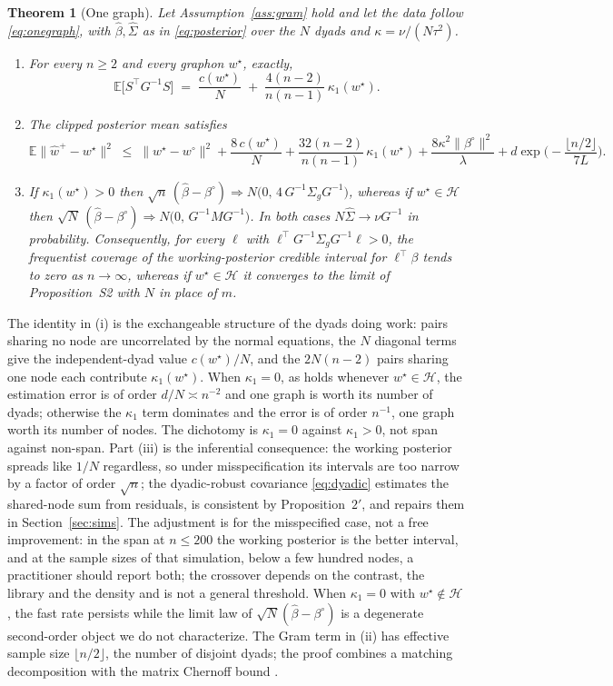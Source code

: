 \documentclass[12pt]{article}
\newtheorem{theorem}{Theorem}
\newcommand{\E}{\mathbb{E}}
\newcommand{\calH}{\mathcal{H}}
\newcommand{\norm}[1]{\|#1\|}
\newcommand{\wstar}{w^{\star}}
\newcommand{\wproj}{w^{\circ}}
\newcommand{\bproj}{\beta^{\circ}}
\newcommand{\whatp}{\hat w^{+}}
\newcommand{\bhat}{\hat\beta}
\newcommand{\Sighat}{\hat\Sigma}
\begin{document}
\begin{theorem}[One graph]
\label{thm:onegraph}
Let Assumption~\ref{ass:gram} hold and let the data follow \eqref{eq:onegraph}, with $\bhat,\Sighat$ as in \eqref{eq:posterior} over the $N$ dyads and $\kappa=\nu/(N\tau^2)$.
\begin{enumerate}
\item[(i)] For every $n\ge2$ and every graphon $\wstar$, exactly,
\[
\E\big[S^{\top}G^{-1}S\big]\;=\;\frac{c(\wstar)}{N}\;+\;\frac{4(n-2)}{n(n-1)}\,\kappa_1(\wstar).
\]
\item[(ii)] The clipped posterior mean satisfies
\[
\E\norm{\whatp-\wstar}^2\;\le\;\norm{\wstar-\wproj}^2+\frac{8\,c(\wstar)}{N}+\frac{32(n-2)}{n(n-1)}\,\kappa_1(\wstar)+\frac{8\kappa^2\norm{\bproj}^2}{\lambda}+d\exp\Big(-\frac{\lfloor n/2\rfloor}{7L}\Big).
\]
\item[(iii)] If $\kappa_1(\wstar)>0$ then $\sqrt n\,(\bhat-\bproj)\Rightarrow N\big(0,\,4\,G^{-1}\Sigma_gG^{-1}\big)$, whereas if $\wstar\in\calH$ then $\sqrt N\,(\bhat-\bproj)\Rightarrow N\big(0,\,G^{-1}MG^{-1}\big)$. In both cases $N\Sighat\to \nu G^{-1}$ in probability. Consequently, for every $\ell$ with $\ell^{\top}G^{-1}\Sigma_gG^{-1}\ell>0$, the frequentist coverage of the working-posterior credible interval for $\ell^{\top}\beta$ tends to zero as $n\to\infty$, whereas if $\wstar\in\calH$ it converges to the limit of Proposition~S2 with $N$ in place of $m$.
\end{enumerate}
\end{theorem}

The identity in (i) is the exchangeable structure of the dyads doing work: pairs sharing no node are uncorrelated by the normal equations, the $N$ diagonal terms give the independent-dyad value $c(\wstar)/N$, and the $2N(n-2)$ pairs sharing one node each contribute $\kappa_1(\wstar)$. When $\kappa_1=0$, as holds whenever $\wstar\in\calH$, the estimation error is of order $d/N\asymp n^{-2}$ and one graph is worth its number of dyads; otherwise the $\kappa_1$ term dominates and the error is of order $n^{-1}$, one graph worth its number of nodes. The dichotomy is $\kappa_1=0$ against $\kappa_1>0$, not span against non-span. Part (iii) is the inferential consequence: the working posterior spreads like $1/N$ regardless, so under misspecification its intervals are too narrow by a factor of order $\sqrt n$; the dyadic-robust covariance \eqref{eq:dyadic} estimates the shared-node sum from residuals, is consistent by Proposition~$2'$, and repairs them in Section~\ref{sec:sims}. The adjustment is for the misspecified case, not a free improvement: in the span at $n\le200$ the working posterior is the better interval, and at the sample sizes of that simulation, below a few hundred nodes, a practitioner should report both; the crossover depends on the contrast, the library and the density and is not a general threshold. When $\kappa_1=0$ with $\wstar\notin\calH$, the fast rate persists while the limit law of $\sqrt N(\bhat-\bproj)$ is a degenerate second-order object we do not characterize. The Gram term in (ii) has effective sample size $\lfloor n/2\rfloor$, the number of disjoint dyads; the proof combines a matching decomposition \citep{Hoeffding1963} with the matrix Chernoff bound \citep{Tropp2012}.
\end{document}
